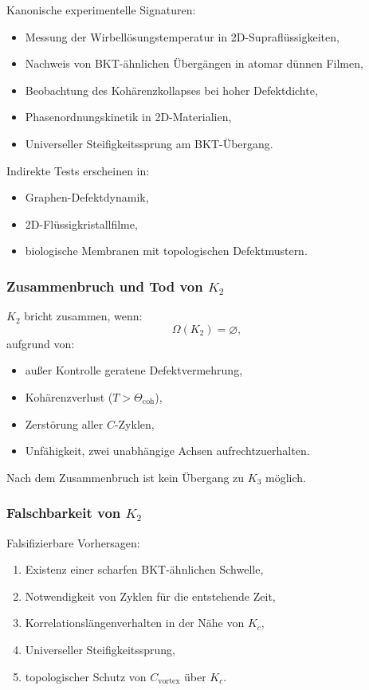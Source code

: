Kanonische experimentelle Signaturen:
\begin{itemize}
    \item Messung der Wirbellösungstemperatur in 2D-Supraflüssigkeiten,
    \item Nachweis von BKT-ähnlichen Übergängen in atomar dünnen Filmen,
    \item Beobachtung des Kohärenzkollapses bei hoher Defektdichte,
    \item Phasenordnungskinetik in 2D-Materialien,
    \item Universeller Steifigkeitssprung am BKT-Übergang.
\end{itemize}

Indirekte Tests erscheinen in:
\begin{itemize}
    \item Graphen-Defektdynamik,
    \item 2D-Flüssigkristallfilme,
    \item biologische Membranen mit topologischen Defektmustern.
\end{itemize}

\subsubsection{Zusammenbruch und Tod von \texorpdfstring{$K_2$}{K_2}}

$K_2$ bricht zusammen, wenn:
\[
\Omega(K_2) = \varnothing,
\]
aufgrund von:
\begin{itemize}
    \item außer Kontrolle geratene Defektvermehrung,
    \item Kohärenzverlust ($T > \Theta_{\mathrm{coh}}$),
    \item Zerstörung aller $C$-Zyklen,
    \item Unfähigkeit, zwei unabhängige Achsen aufrechtzuerhalten.
\end{itemize}

Nach dem Zusammenbruch ist kein Übergang zu $K_3$ möglich.

\subsubsection{Falschbarkeit von \texorpdfstring{$K_2$}{K_2}}

Falsifizierbare Vorhersagen:
\begin{enumerate}
    \item Existenz einer scharfen BKT-ähnlichen Schwelle,
    \item Notwendigkeit von Zyklen für die entstehende Zeit,
    \item Korrelationslängenverhalten in der Nähe von $K_c$,
    \item Universeller Steifigkeitssprung,
    \item topologischer Schutz von $C_{\mathrm{vortex}}$ über $K_c$.
\end{enumerate}

